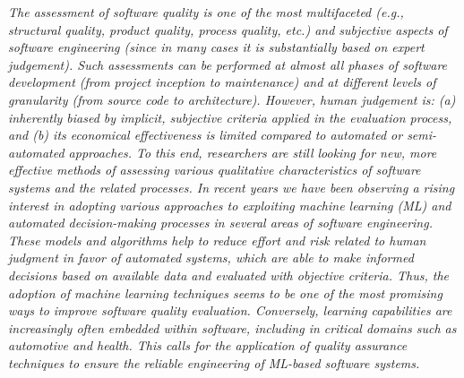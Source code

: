 \begin{myquote}{0.2in}
    \itshape
    The assessment of software quality is one of the most multifaceted (e.g., structural quality, product quality, process quality, etc.) and subjective aspects of software engineering (since in many cases it is substantially based on expert judgement).
    Such assessments can be performed at almost all phases of software development (from project inception to maintenance) and at different levels of granularity (from source code to architecture). However, human judgement is: (a) inherently biased by implicit, subjective criteria applied in the evaluation process, and (b) its economical effectiveness is limited compared to automated or semi-automated approaches.
    To this end, researchers are still looking for new, more effective methods of assessing various qualitative characteristics of software systems and the related processes.
    In recent years we have been observing a rising interest in adopting various approaches to exploiting machine learning (ML) and automated decision-making processes in several areas of software engineering. These models and algorithms help to reduce effort and risk related to human judgment in favor of automated systems, which are able to make informed decisions based on available data and evaluated with objective criteria.
    Thus, the adoption of machine learning techniques seems to be one of the most promising ways to improve software quality evaluation.
    Conversely, learning capabilities are increasingly often embedded within software, including in critical domains such as automotive and health.
    This calls for the application of quality assurance techniques to ensure the reliable engineering of ML-based software systems.
\end{myquote}

